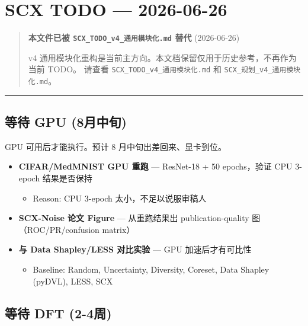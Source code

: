 \documentclass[
  12pt,
]{ctexart}
\author{SCX}
\date{2026}
\providecommand{\tightlist}{%
  \setlength{\itemsep}{0pt}\setlength{\parskip}{0pt}}
\begin{document}
\section{SCX TODO --- 2026-06-26}\label{scx-todo-2026-06-26}

\begin{quote}
\textbf{本文件已被 \texttt{SCX\_TODO\_v4\_通用模块化.md} 替代}
(2026-06-26)

v4 通用模块化重构是当前主方向。本文档保留仅用于历史参考，不再作为当前
TODO。 请查看 \texttt{SCX\_TODO\_v4\_通用模块化.md} 和
\texttt{SCX\_规划\_v4\_通用模块化.md}。
\end{quote}

\begin{center}\rule{0.5\linewidth}{0.5pt}\end{center}

\subsection{等待 GPU
(8月中旬)}\label{ux7b49ux5f85-gpu-8ux6708ux4e2dux65ec}

GPU 可用后才能执行。预计 8 月中旬出差回来、显卡到位。

\begin{itemize}
\tightlist
\item[$\square$]
  \textbf{CIFAR/MedMNIST GPU 重跑} --- ResNet-18 + 50 epochs，验证 CPU
  3-epoch 结果是否保持

  \begin{itemize}
  \tightlist
  \item
    Reason: CPU 3-epoch 太小，不足以说服审稿人
  \end{itemize}
\item[$\square$]
  \textbf{SCX-Noise 论文 Figure} --- 从重跑结果出 publication-quality
  图（ROC/PR/confusion matrix）
\item[$\square$]
  \textbf{与 Data Shapley/LESS 对比实验} --- GPU 加速后才有可比性

  \begin{itemize}
  \tightlist
  \item
    Baseline: Random, Uncertainty, Diversity, Coreset, Data Shapley
    (pyDVL), LESS, SCX
  \end{itemize}
\end{itemize}

\subsection{等待 DFT (2-4周)}\label{ux7b49ux5f85-dft-2-4ux5468}
\end{document}
